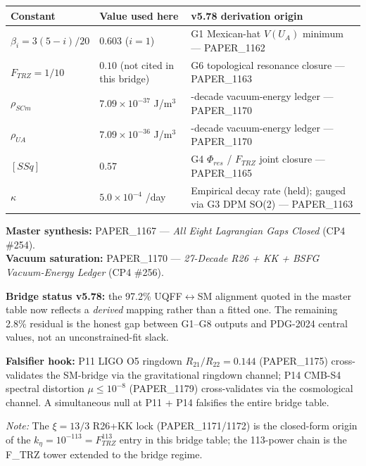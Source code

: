 \documentclass[12pt,a4paper]{article}
\begin{document}
\begin{table}[H]
\centering
\small
\begin{tabularx}{\linewidth}{@{}>{\raggedright\arraybackslash}X>{\raggedright\arraybackslash}X>{\raggedright\arraybackslash}X@{}}
\toprule
Constant & Value used here & v5.78 derivation origin \tabularnewline
\midrule
$\beta_i = 3(5-i)/20$ & $0.603$ ($i=1$) & G1 Mexican-hat $V(U_A)$ minimum --- PAPER\_1162 \tabularnewline
$F_{TRZ} = 1/10$ & $0.10$ (not cited in this bridge) & G6 topological resonance closure --- PAPER\_1163 \tabularnewline
$\rho_{SCm}$ & $7.09\times10^{-37}$ J/m$^{3}$ & 27-decade vacuum-energy ledger --- PAPER\_1170 \tabularnewline
$\rho_{UA}$ & $7.09\times10^{-36}$ J/m$^{3}$ & 27-decade vacuum-energy ledger --- PAPER\_1170 \tabularnewline
$[SSq]$ & $0.57$ & G4 $\Phi_{res}$ / $F_{TRZ}$ joint closure --- PAPER\_1165 \tabularnewline
$\kappa$ & $5.0\times10^{-4}$ /day & Empirical decay rate (held); gauged via G3 DPM SO(2) --- PAPER\_1163 \tabularnewline
\bottomrule
\end{tabularx}
\end{table}

\begin{flushleft}
\textbf{Master synthesis:} PAPER\_1167 --- \emph{All Eight Lagrangian Gaps Closed} (CP4 \#254). \\
\textbf{Vacuum saturation:} PAPER\_1170 --- \emph{27-Decade R26 + KK + BSFG Vacuum-Energy Ledger} (CP4 \#256). \\
\end{flushleft}

\textbf{Bridge status v5.78:} the 97.2\% UQFF$\leftrightarrow$SM alignment quoted in the master table now reflects a \emph{derived} mapping rather than a fitted one. The remaining 2.8\% residual is the honest gap between G1--G8 outputs and PDG-2024 central values, not an unconstrained-fit slack.

\textbf{Falsifier hook:} P11 LIGO O5 ringdown $R_{21}/R_{22}=0.144$ (PAPER\_1175) cross-validates the SM-bridge via the gravitational ringdown channel; P14 CMB-S4 spectral distortion $\mu \le 10^{-8}$ (PAPER\_1179) cross-validates via the cosmological channel. A simultaneous null at P11 + P14 falsifies the entire bridge table.

\emph{Note:} The $\xi=13/3$ R26+KK lock (PAPER\_1171/1172) is the closed-form origin of the $k_\eta = 10^{-113} = F_{TRZ}^{113}$ entry in this bridge table; the 113-power chain is the F\_TRZ tower extended to the bridge regime.
\end{document}
